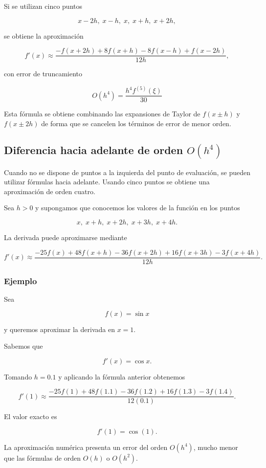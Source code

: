 \documentclass[12pt,a4paper]{article}
\theoremstyle{definition}
\theoremstyle{remark}
\begin{document}
Si se utilizan cinco puntos

\[
x-2h,\;x-h,\;x,\;x+h,\;x+2h,
\]

se obtiene la aproximación

\[
f'(x) \approx
\frac{-f(x+2h)+8f(x+h)-8f(x-h)+f(x-2h)}{12h},
\]

con error de truncamiento


\[
O(h^4)= \frac{h^4 f^{(5)}(\xi)}{30}
\]

Esta fórmula se obtiene combinando las expansiones de Taylor de
$f(x\pm h)$ y $f(x\pm2h)$ de forma que se cancelen los términos
de error de menor orden.





\subsection*{Diferencia hacia adelante de orden $O(h^4)$}

Cuando no se dispone de puntos a la izquierda del punto de evaluación,
se pueden utilizar fórmulas hacia adelante. Usando cinco puntos se obtiene
una aproximación de orden cuatro.

Sea $h>0$ y supongamos que conocemos los valores de la función en los puntos

\[
x,\; x+h,\; x+2h,\; x+3h,\; x+4h.
\]

La derivada puede aproximarse mediante

\[
f'(x) \approx 
\frac{-25f(x) + 48f(x+h) - 36f(x+2h) + 16f(x+3h) - 3f(x+4h)}{12h}.
\]



\subsubsection*{Ejemplo}

Sea

\[
f(x)=\sin x
\]

y queremos aproximar la derivada en $x=1$.

Sabemos que

\[
f'(x)=\cos x.
\]

Tomando $h=0.1$ y aplicando la fórmula anterior obtenemos

\[
f'(1) \approx
\frac{-25f(1)+48f(1.1)-36f(1.2)+16f(1.3)-3f(1.4)}{12(0.1)}.
\]

El valor exacto es

\[
f'(1)=\cos(1).
\]

La aproximación numérica presenta un error del orden $O(h^4)$,
mucho menor que las fórmulas de orden $O(h)$ o $O(h^2)$.
\end{document}
